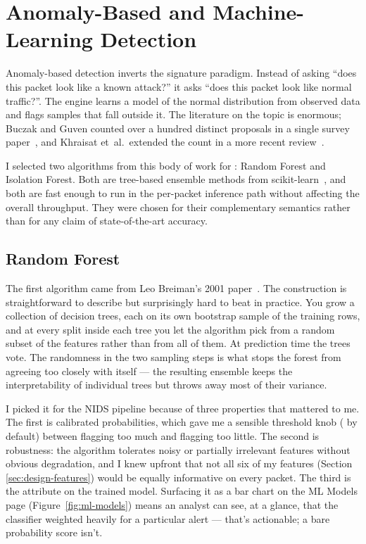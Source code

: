 \section{Anomaly-Based and Machine-Learning Detection}
\label{sec:bg-ml}

Anomaly-based detection inverts the signature paradigm. Instead of
asking ``does this packet look like a known attack?'' it asks ``does
this packet look like normal traffic?''. The engine learns a model of
the normal distribution from observed data and flags samples that fall
outside it. The literature on the topic is enormous; Buczak and Guven
counted over a hundred distinct proposals in a single survey
paper~\cite{buczak2016survey}, and Khraisat et~al.\ extended the count
in a more recent review~\cite{khraisat2019survey}.

I selected two algorithms from this body of work for \nidsname{}:
Random Forest and Isolation Forest. Both are tree-based ensemble
methods from scikit-learn~\cite{pedregosa2011scikit}, and both are
fast enough to run in the per-packet inference path without affecting
the overall throughput. They were chosen for their complementary
semantics rather than for any claim of state-of-the-art accuracy.

\subsection{Random Forest}
\label{sec:bg-rf}

The first algorithm came from Leo Breiman's 2001
paper~\cite{breiman2001random}. The construction is
straightforward to describe but surprisingly hard to beat in
practice. You grow a collection of decision trees, each on its
own bootstrap sample of the training rows, and at every split
inside each tree you let the algorithm pick from a random
subset of the features rather than from all of them. At
prediction time the trees vote. The randomness in the two
sampling steps is what stops the forest from agreeing too
closely with itself --- the resulting ensemble keeps the
interpretability of individual trees but throws away most of
their variance.

I picked it for the NIDS pipeline because of three properties
that mattered to me. The first is calibrated probabilities,
which gave me a sensible threshold knob ( by default)
between flagging too much and flagging too little. The second
is robustness: the algorithm tolerates noisy or partially
irrelevant features without obvious degradation, and I knew
upfront that not all six of my features (Section
\ref{sec:design-features}) would be equally informative on
every packet. The third is the 
attribute on the trained model. Surfacing it as a bar chart on
the ML Models page (Figure~\ref{fig:ml-models}) means an
analyst can see, at a glance, that the classifier weighted
 heavily for a particular alert ---
that's actionable; a bare probability score isn't.

